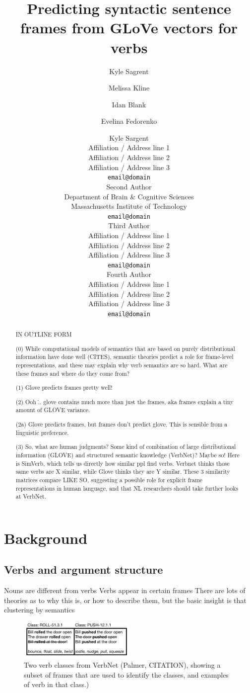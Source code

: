\documentclass[11pt,a4paper]{article}
\title{Predicting syntactic sentence frames from GLoVe vectors for verbs}
\author[1]{Kyle Sagrent}
\author[2]{Melissa Kline}
\author[2]{Idan Blank}
\author[3,4]{Evelina Fedorenko}
\affil[1]{Harvard University}
\affil[2]{Department of Brain \& Cognitive Sciences, Massachusetts Institute of Technology}
\affil[3]{Massachusetts General Hospital}
\affil[4]{Harvard Medical School}
\author{Kyle Sargent \\
  Affiliation / Address line 1 \\
  Affiliation / Address line 2 \\
  Affiliation / Address line 3 \\
  {\tt email@domain} \\\And
  Second Author \\
  Department of Brain \& Cognitive Sciences \\
  Massachusetts Institute of Technology \\
  {\tt email@domain} \\\And
  Third Author \\
  Affiliation / Address line 1 \\
  Affiliation / Address line 2 \\
  Affiliation / Address line 3 \\
  {\tt email@domain} \\\And
  Fourth Author \\
  Affiliation / Address line 1 \\
  Affiliation / Address line 2 \\
  Affiliation / Address line 3 \\
  {\tt email@domain} \\
}
\date{}
\begin{document}
\maketitle
\begin{abstract}
  IN OUTLINE FORM
  
  (0) While computational models of semantics that are based on purely distributional information have done well (CITES), semantic theories predict a role for frame-level representations, and these may explain why verb semantics are so hard. What are these frames and where do they come from? 
  
  (1) Glove predicts frames pretty well!
  
  (2) Ooh \... glove contains much more than just the frames, aka frames explain a tiny amount of GLOVE variance. 
  
  (2a) Glove predicts frames, but frames don't predict glove. This is sensible from a linguistic preference. 
  
  (3) So, what are human judgments? Some kind of combination of large distributional information (GLOVE) and structured semantic knowledge (VerbNet)? Maybe so! Here is SimVerb, which tells us directly how similar ppl find verbs.  Verbnet thinks those same verbs are X similar, while Glove thinks they are Y similar. These 3 similarity matrices compare LIKE SO, suggesting a possible role for explicit frame representations in human language, and that NL researchers should take further looks at VerbNet. 
\end{abstract}

\section{Background}
\subsection{Verbs and argument structure}
Nouns are different from verbs
Verbs appear in certain frames
There are lots of theories as to why this is, or how to describe them, but the basic insight is that clustering by semantics 


\begin{figure}
	\centering
	\includegraphics[width=0.5\textwidth]{VerbTable.png}
	\caption{\label{fig:frog} Two verb classes from VerbNet (Palmer, CITATION), showing a subset of frames that are used to identify the classes, and examples of verb in that class.)}
\end{figure}
\end{document}
